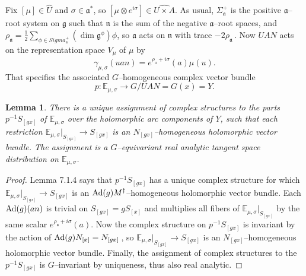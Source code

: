 \documentclass{conm-p-l}
\newtheorem{lemma}[equation]{Lemma}
\renewcommand{\gg}{\mathfrak{g}}
\def\ga{\mathfrak{a}}
\def\gg{\mathfrak{g}}
\def\gn{\mathfrak{n}}
\def\Ad{{\rm Ad}}
\def\E{\mathbb{E}}
\begin{document}
Fix $[\mu] \in \widehat{U}$ and $\sigma \in \ga^*$,
	so $[\mu \otimes e^{i\sigma}] \in \widehat{U\times A}$.
As usual, $\Sigma_\ga^+$ is the positive $\ga$--root system on $\gg$
such that $\gn$ is the sum of the negative $\ga$--root spaces, and
$\rho_\ga = \frac{1}{2}\sum_{\phi \in Sigma_\ga^+} (\dim \gg^\phi)\phi$, 
so $\ga$ acts on $\gn$ with trace $-2\rho_\ga$\,.  Now $UAN$ acts on the
representation space $V_\mu$ of $\mu$ by
$$
\gamma_{\mu,\sigma}(uan) = e^{\rho_a + i\sigma}(a)\mu(u).
$$
That specifies the associated $G$--homogeneous complex vector bundle
\begin{equation}\label{8.1.4}
p:\E_{\mu,\sigma} \to G/UAN = G(x) = Y.
\end{equation}

\begin{lemma}\label{8.1.5}
There is a unique assignment of complex 
structures to the parts $p^{-1}S_{[gx]}$ of $\E_{\mu,\sigma}$ over
the holomorphic arc components of $Y$, such that each restriction
$\E_{\mu,\sigma}|_{S_{[gx]}} \to S_{[gx]}$ is an $N_{[gx]}$--homogeneous
holomorphic vector bundle.  The assignment is a $G$--equivariant 
real analytic tangent space distribution on $\E_{\mu,\sigma}$.
\end{lemma}

\begin{proof} Lemma 7.1.4 says that $p^{-1}S_{[gx]}$ has a unique complex 
structure for which $\E_{\mu,\sigma}|_{S_{[gx]}} \to S_{[gx]}$ is an
$\Ad(g)M^\dagger$--homogeneous holomorphic vector bundle.  Each
$\Ad(g)(an)$ is trivial on $S_{[gx]} = gS_{[x]}$ and multiplies all fibers of
$\E_{\mu,\sigma}|_{S_{[gx]}}$ by the same scalar $e^{\rho_\ga + i\sigma}(a)$.
Now the complex structure on $p^{-1}S_{[gx]}$ is invariant by the action of
$\Ad(g)N_{[x]} = N_{[gx]}$\,, so $\E_{\mu,\sigma}|_{S_{[gx]}} \to S_{[gx]}$
is an $N_{[gx]}$--homogeneous holomorphic vector bundle.  Finally, the
assignment of complex structures to the $p^{-1}S_{[gx]}$ is $G$--invariant
by uniqueness, thus also real analytic. 
\end{proof}
\end{document}

